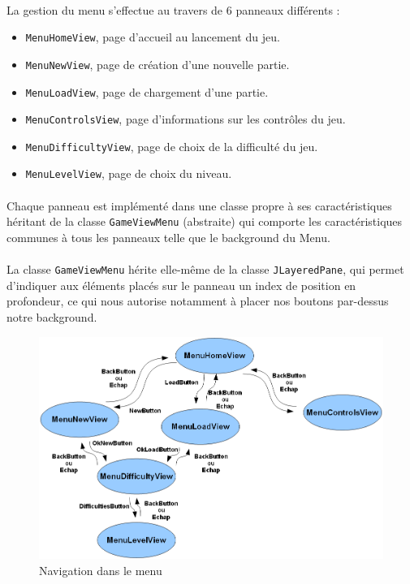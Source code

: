 \documentclass[a4paper,12pt]{report}
\begin{document}
\paragraph{}La gestion du menu s’effectue au travers de 6 panneaux différents : 
\begin{itemize}
\item \verb+MenuHomeView+, page d’accueil au lancement du jeu.
\item \verb+MenuNewView+, page de création d’une nouvelle partie.
\item \verb+MenuLoadView+, page de chargement d’une partie.
\item \verb+MenuControlsView+, page d’informations sur les contrôles du jeu.
\item \verb+MenuDifficultyView+, page de choix de la difficulté du jeu.
\item \verb+MenuLevelView+, page de choix du niveau.
\end{itemize}

\paragraph{}Chaque panneau est implémenté dans une classe propre à ses caractéristiques héritant de la classe \verb+GameViewMenu+ (abstraite) qui comporte les caractéristiques communes à tous les panneaux telle que le background du Menu.

\paragraph{}La classe \verb+GameViewMenu+ hérite elle-même de la classe \verb+JLayeredPane+, qui permet d’indiquer aux éléments placés sur le panneau un index de position en profondeur, ce qui nous autorise notamment à placer nos boutons par-dessus notre background.

\begin{figure}[H]
\begin{center}
\includegraphics[scale=0.5]{images/navigationmenu.png} 
\end{center}
\caption{Navigation dans le menu}
\label{Navigation dans le menu}
\end{figure}
\end{document}
